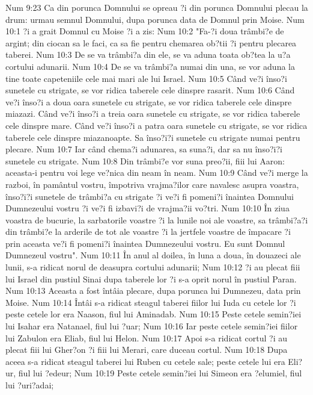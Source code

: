 Num 9:23  Ca din porunca Domnului se opreau ?i din porunca Domnului plecau la drum: urmau semnul Domnului, dupa porunca data de Domnul prin Moise.
Num 10:1  ?i a grait Domnul cu Moise ?i a zis:
Num 10:2  "Fa-?i doua trâmbi?e de argint; din ciocan sa le faci, ca sa fie pentru chemarea ob?tii ?i pentru plecarea taberei.
Num 10:3  De se va trâmbi?a din ele, se va aduna toata ob?tea la u?a cortului adunarii.
Num 10:4  De se va trâmbi?a numai din una, se vor aduna la tine toate capeteniile cele mai mari ale lui Israel.
Num 10:5  Când ve?i înso?i sunetele cu strigate, se vor ridica taberele cele dinspre rasarit.
Num 10:6  Când ve?i înso?i a doua oara sunetele cu strigate, se vor ridica taberele cele dinspre miazazi. Când ve?i înso?i a treia oara sunetele cu strigate, se vor ridica taberele cele dinspre mare. Când ve?i înso?i a patra oara sunetele cu strigate, se vor ridica taberele cele dinspre miazanoapte. Sa înso?i?i sunetele cu strigate numai pentru plecare.
Num 10:7  Iar când chema?i adunarea, sa suna?i, dar sa nu înso?i?i sunetele cu strigate.
Num 10:8  Din trâmbi?e vor suna preo?ii, fiii lui Aaron: aceasta-i pentru voi lege ve?nica din neam în neam.
Num 10:9  Când ve?i merge la razboi, în pamântul vostru, împotriva vrajma?ilor care navalesc asupra voastra, înso?i?i sunetele de trâmbi?a cu strigate ?i ve?i fi pomeni?i înaintea Domnului Dumnezeului vostru ?i ve?i fi izbavi?i de vrajma?ii vo?tri.
Num 10:10  În ziua voastra de bucurie, la sarbatorile voastre ?i la lunile noi ale voastre, sa trâmbi?a?i din trâmbi?e la arderile de tot ale voastre ?i la jertfele voastre de împacare ?i prin aceasta ve?i fi pomeni?i înaintea Dumnezeului vostru. Eu sunt Domnul Dumnezeul vostru".
Num 10:11  În anul al doilea, în luna a doua, în douazeci ale lunii, s-a ridicat norul de deasupra cortului adunarii;
Num 10:12  ?i au plecat fiii lui Israel din pustiul Sinai dupa taberele lor ?i s-a oprit norul în pustiul Paran.
Num 10:13  Aceasta a fost întâia plecare, dupa porunca lui Dumnezeu, data prin Moise.
Num 10:14  Întâi s-a ridicat steagul taberei fiilor lui Iuda cu cetele lor ?i peste cetele lor era Naason, fiul lui Aminadab.
Num 10:15  Peste cetele semin?iei lui Isahar era Natanael, fiul lui ?uar;
Num 10:16  Iar peste cetele semin?iei fiilor lui Zabulon era Eliab, fiul lui Helon.
Num 10:17  Apoi s-a ridicat cortul ?i au plecat fiii lui Gher?on ?i fiii lui Merari, care duceau cortul.
Num 10:18  Dupa aceea s-a ridicat steagul taberei lui Ruben cu cetele sale; peste cetele lui era Eli?ur, fiul lui ?edeur;
Num 10:19  Peste cetele semin?iei lui Simeon era ?elumiel, fiul lui ?uri?adai;

